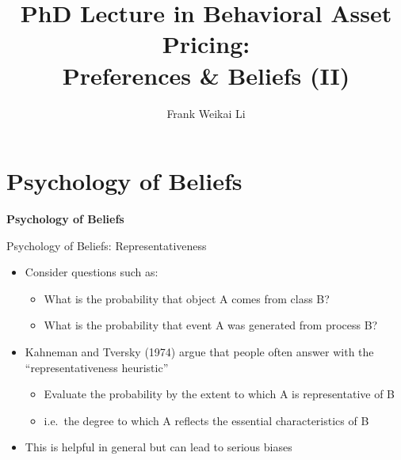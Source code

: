 \documentclass[aspectratio=169, 11pt]{beamer}
\title[EF8083 Lecture 4]{PhD Lecture in Behavioral Asset Pricing:\\ Preferences \& Beliefs (II)}
\author[F.\ W.\ Li]{Frank Weikai Li}
\institute[CityU]{Associate Professor of Finance\\City University of Hong Kong}
\date{}
\begin{document}

\begin{frame}[plain]
\titlepage
\end{frame}

\section{Psychology of Beliefs}

\begin{frame}{}
\vfill
\centering
{\Large \textbf{Psychology of Beliefs}}
\vfill
\end{frame}

\begin{frame}{Psychology of Beliefs: Representativeness}
\begin{itemize}
\item Consider questions such as:
  \begin{itemize}
  \item What is the probability that object A comes from class B?
  \item What is the probability that event A was generated from process B?
  \end{itemize}
\item Kahneman and Tversky (1974) argue that people often answer with the ``representativeness heuristic''
  \begin{itemize}
  \item Evaluate the probability by the extent to which A is representative of B
  \item i.e.\ the degree to which A reflects the essential characteristics of B
  \end{itemize}
\item This is helpful in general but can lead to serious biases
\end{itemize}
\end{frame}
\end{document}
